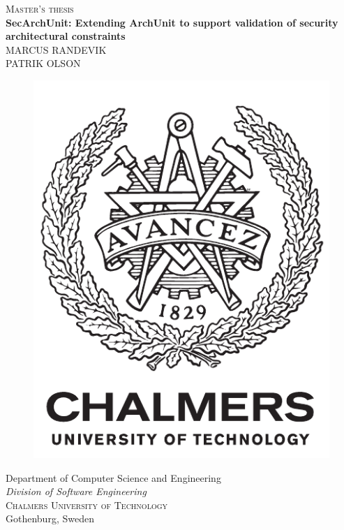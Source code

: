 \newpage
\thispagestyle{empty}
\begin{center}
	\textsc{\large Master's thesis \the\year}\\[4cm]		%
	\textbf{\Large SecArchUnit: Extending ArchUnit to support validation of security architectural constraints} \\[1cm]
	{\large MARCUS RANDEVIK}\\
	{\large PATRIK OLSON}
	
	\vfill	
	\begin{figure}[H]
	\centering
	\includegraphics[width=0.2\pdfpagewidth]{figure/auxiliary/logo_eng.pdf} \\	
	\end{figure}	\vspace{5mm}	
	
	Department of Computer Science and Engineering \\
	\emph{Division of Software Engineering}\\
	\textsc{Chalmers University of Technology} \\
	Gothenburg, Sweden \the\year \\
\end{center}


